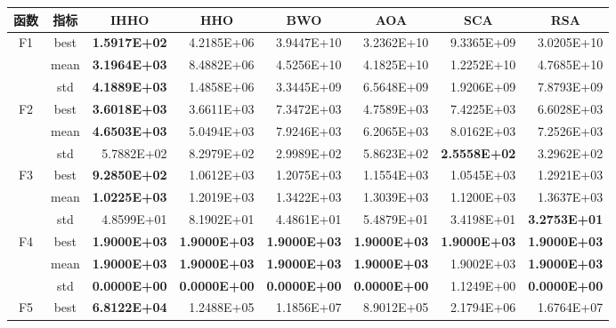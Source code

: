 \documentclass{wzuthesis}
\begin{document}
\begin{table}[htbp]
  \centering
    \small
    \label{tb:CEC2020-dim30}
    \begin{tabular}{ccrrrrrr}
        \toprule
    函数    & 指标    & \multicolumn{1}{c}{IHHO} & \multicolumn{1}{c}{HHO} & \multicolumn{1}{c}{BWO} & \multicolumn{1}{c}{AOA} & \multicolumn{1}{c}{SCA} & \multicolumn{1}{c}{RSA} \\
    \midrule
    \multirow{3}[0]{*}{F1} & best  & \textbf{1.5917E+02} & 4.2185E+06 & 3.9447E+10 & 3.2362E+10 & 9.3365E+09 & 3.0205E+10 \\
          & mean  & \textbf{3.1964E+03} & 8.4882E+06 & 4.5256E+10 & 4.1825E+10 & 1.2252E+10 & 4.7685E+10 \\
          & std   & \textbf{4.1889E+03} & 1.4858E+06 & 3.3445E+09 & 6.5648E+09 & 1.9206E+09 & 7.8793E+09 \\
    \multirow{3}[0]{*}{F2} & best  & \textbf{3.6018E+03} & 3.6611E+03 & 7.3472E+03 & 4.7589E+03 & 7.4225E+03 & 6.6028E+03 \\
          & mean  & \textbf{4.6503E+03} & 5.0494E+03 & 7.9246E+03 & 6.2065E+03 & 8.0162E+03 & 7.2526E+03 \\
          & std   & 5.7882E+02 & 8.2979E+02 & 2.9989E+02 & 5.8623E+02 & \textbf{2.5558E+02} & 3.2962E+02 \\
    \multirow{3}[0]{*}{F3} & best  & \textbf{9.2850E+02} & 1.0612E+03 & 1.2075E+03 & 1.1554E+03 & 1.0545E+03 & 1.2921E+03 \\
          & mean  & \textbf{1.0225E+03} & 1.2019E+03 & 1.3422E+03 & 1.3039E+03 & 1.1200E+03 & 1.3637E+03 \\
          & std   & 4.8599E+01 & 8.1902E+01 & 4.4861E+01 & 5.4879E+01 & 3.4198E+01 & \textbf{3.2753E+01} \\
    \multirow{3}[0]{*}{F4} & best  & \textbf{1.9000E+03} & \textbf{1.9000E+03} & \textbf{1.9000E+03} & \textbf{1.9000E+03} & \textbf{1.9000E+03} & \textbf{1.9000E+03} \\
          & mean  & \textbf{1.9000E+03} & \textbf{1.9000E+03} & \textbf{1.9000E+03} & \textbf{1.9000E+03} & 1.9002E+03 & \textbf{1.9000E+03} \\
          & std   & \textbf{0.0000E+00} & \textbf{0.0000E+00} & \textbf{0.0000E+00} & \textbf{0.0000E+00} & 1.1249E+00 & \textbf{0.0000E+00} \\
    \multirow{3}[0]{*}{F5} & best  & \textbf{6.8122E+04} & 1.2488E+05 & 1.1856E+07 & 8.9012E+05 & 2.1794E+06 & 1.6764E+07 \\

\end{tabular}
\end{table}
\end{document}

